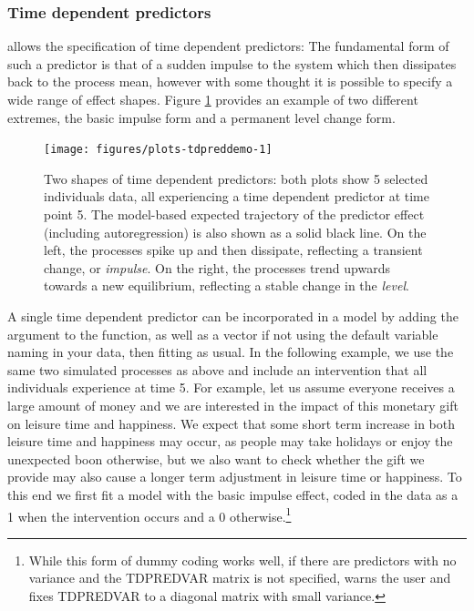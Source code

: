 \documentclass[nojss]{jss}\usepackage[]{graphicx}\usepackage[]{color}
\begin{document}
\subsubsection{Time dependent predictors} \label{sec:tdpreds}\nopagebreak
{} allows the specification of time dependent predictors: The fundamental form of such a predictor is that of a sudden impulse to the system which then dissipates back to the process mean, however with some thought it is possible to specify a wide range of effect shapes. Figure \ref{fig:tdpredtypes} provides an example of two different extremes, the basic impulse form and a permanent level change form.

\begin{figure}[!h]
\begin{Schunk}


{\centering \texttt{[image: figures/plots-tdpreddemo-1]} 

}

\end{Schunk}
\caption{ \label{fig:tdpredtypes} Two shapes of time dependent predictors: both plots show 5 selected individuals data, all experiencing a time dependent predictor at time point 5. The model-based expected trajectory of the predictor effect (including autoregression) is also shown as a solid black line. On the left, the processes spike up and then dissipate, reflecting a transient change, or \textit{impulse}. On the right, the processes trend upwards towards a new equilibrium, reflecting a stable change in the \textit{level}.}
\end{figure}

A single time dependent predictor can be incorporated in a  model by adding the argument  to the  function, as well as a  vector if not using the default variable naming in your data, then fitting as usual. In the following example, we use the same two simulated processes as above and include an intervention that all individuals experience at time 5. For example, let us assume everyone receives a large amount of money and we are interested in the impact of this monetary gift on leisure time and happiness. We expect that some short term increase in both leisure time and happiness may occur, as people may take holidays or enjoy the unexpected boon otherwise, but we also want to check whether the gift we provide may also cause a longer term adjustment in leisure time or happiness. To this end we first fit a model with the basic impulse effect, coded in the data as a 1 when the intervention occurs and a 0 otherwise.\footnote{While this form of dummy coding works well, if there are predictors with no variance and the TDPREDVAR matrix is not specified,  warns the user and fixes TDPREDVAR to a diagonal matrix with small variance.}   
\end{document}
